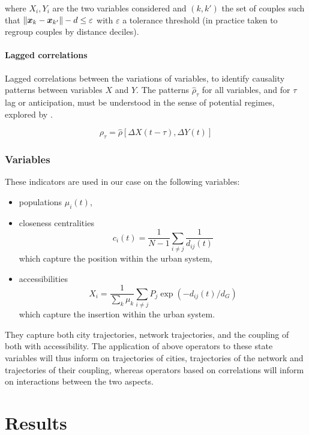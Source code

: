 where $X_i, Y_i$ are the two variables considered and $(k,k')$ the set of couples such that $\norm{\vec{x}_k-\vec{x}_{k'}} - d \leq \varepsilon$ with $\varepsilon$ a tolerance threshold (in practice taken to regroup couples by distance deciles).


\paragraph{Lagged correlations}

Lagged correlations between the variations of variables, to identify causality patterns between variables $X$ and $Y$. The patterns $\hat{\rho}_{\tau}$ for all variables, and for $\tau$ lag or anticipation, must be understood in the sense of potential regimes, explored by \cite{raimbault2017identification}.

\begin{equation}
\rho_{\tau} = \hat{\rho}\left[\Delta X(t-\tau),\Delta Y(t)\right]
\end{equation}


\subsubsection{Variables}


These indicators are used in our case on the following variables:
\begin{itemize}
	\item populations $\mu_i(t)$,
	\item closeness centralities
	\[c_i(t) = \frac{1}{N-1}\sum_{i\neq j} \frac{1}{d_{ij}(t)}\]
	which capture the position within the urban system,
	\item accessibilities \[X_i = \frac{1}{\sum_k \mu_k}\sum_{i\neq j} P_j \exp{\left(- d_{ij}(t)/d_G\right)}\] which capture the insertion within the urban system.
\end{itemize}

They capture both city trajectories, network trajectories, and the coupling of both with accessibility. The application of above operators to these state variables will thus inform on trajectories of cities, trajectories of the network and trajectories of their coupling, whereas operators based on correlations will inform on interactions between the two aspects.



\section{Results}


